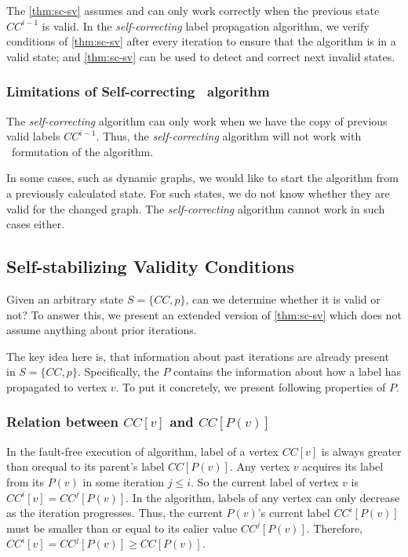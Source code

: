The \cref{thm:sc-sv}  assumes and can only work correctly when the previous state $CC^{i-1}$  is valid. In the \emph{self-correcting} label propagation algorithm,  we verify conditions of \cref{thm:sc-sv} after every iteration to ensure that the algorithm is in a valid state; and \cref{thm:sc-sv} can be used to detect and correct next invalid states. 

\subsubsection{Limitations of Self-correcting \sv~algorithm}
The \emph{self-correcting} algorithm can only work when we have the copy of previous valid labels  $CC^{i-1}$. Thus, the \emph{self-correcting} \sv algorithm will not work with \async~formutation of the \sv algorithm. 

In some cases, such as dynamic graphs, we would like to start the algorithm from a previously calculated state. For such states, we do not know whether they are valid for the changed graph.  The \emph{self-correcting} algorithm cannot work in such cases either.


\subsection{ Self-stabilizing Validity Conditions}

Given an arbitrary state $S=\{CC, p\}$, can we determine whether it is valid
or not?  To answer this, we present an extended version of \cref{thm:sc-sv}
which does not assume anything about prior iterations.

The key idea here is, that information about past iterations are already
present in $S=\{CC, p\}$.  Specifically, the $P$ contains the information
about how a label has propagated to vertex $v$. To put it concretely,  we
present following properties of $P$.

\subsubsection{ Relation between $CC[v]$ and $CC[P(v)]$} 

 In the fault-free execution of  \sv algorithm,  label of a vertex $CC[v]$ is
always greater than orequal to its parent's label  $CC[P(v)]$. Any vertex $v$
acquires its label from its $P(v)$ in some iteration $j\leq i$. So the current
label of vertex $v$ is $CC^{i}[v]=CC^{j}[P(v)]$. In the \sv algorithm, labels
of any vertex can only decrease as the iteration progresses. Thus, the current
$P(v)$'s current label $  CC^{i}[P(v)] $ must be smaller than or equal to its
ealier value $CC^{j}[P(v)]$.  Therefore,  $CC^{i}[v] =CC^{j}[P(v)] \geq
CC[P(v)]$.

